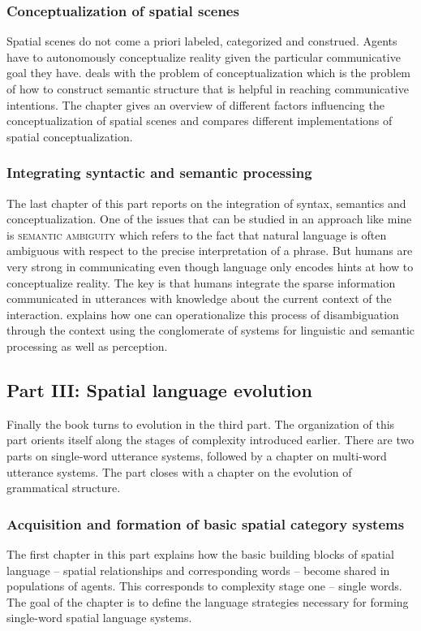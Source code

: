 \subsubsection{Conceptualization of spatial scenes}
Spatial scenes do not come a priori labeled, categorized and construed.
Agents have to autonomously conceptualize reality given the
particular communicative goal they have. 
 deals with the problem
of conceptualization which is the problem of how to construct semantic
structure that is helpful in reaching communicative intentions. The chapter
gives an overview of different factors influencing the conceptualization
of spatial scenes and compares different implementations of 
spatial conceptualization.

\subsubsection{Integrating syntactic and semantic processing}
The last chapter of this part reports on the integration of syntax, semantics 
and conceptualization. One of the issues that can be studied in an approach
like mine is \textsc{semantic ambiguity} which refers to the fact that natural
language is often ambiguous with respect to the precise interpretation
of a phrase. But humans are very strong in communicating even though 
language only encodes hints at how to conceptualize reality. The key
is that humans integrate the sparse information communicated in utterances 
with knowledge about the current context of the interaction. 
explains how one can operationalize this process of disambiguation through
the context using the conglomerate of systems for linguistic and semantic
processing as well as perception.



\subsection{Part III: Spatial language evolution}
Finally the book turns to evolution in the third part. The organization of this part
orients itself along the stages of complexity introduced earlier. There are two
parts on single-word utterance systems, followed by a chapter on multi-word utterance
systems. The part closes with a chapter on the evolution of grammatical structure.

\subsubsection{Acquisition and formation of basic spatial category systems} 
The first chapter in this part explains how the basic building blocks of 
spatial language -- spatial relationships and corresponding words --  
become shared in populations of agents.
This corresponds to complexity stage one -- single words. The goal of the chapter is 
to define the language strategies necessary for forming single-word spatial language systems. 

